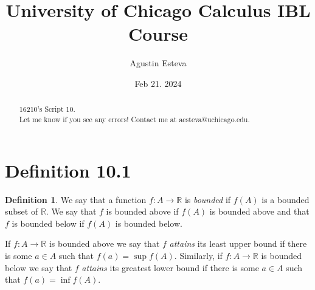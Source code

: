 \documentclass[openany, amssymb, psamsfonts]{amsart}
\title{University of Chicago Calculus IBL Course}
\author{Agustin Esteva}
\date{Feb 21. 2024}
\newcommand{\bbR}{\mathbb{R}}
\theoremstyle{definition}
\newtheorem{defn}{Definition}[section]
\numberwithin{equation}{section}
\begin{document}
\begin{abstract}

16210's Script 10.\\ Let me know if you see any errors! Contact me at aesteva@uchicago.edu.


\end{abstract}

\maketitle

\tableofcontents

\setcounter{section}{10}
\section*{Definition 10.1}
\begin{defn}
\label{10.1}
	We say that a function $f\colon A \to \bbR$ is \emph{bounded} if $f(A)$ is a bounded subset of $\bbR$. We say that $f$ is bounded above if $f(A)$ is bounded above and that $f$ is bounded below if $f(A)$ is bounded below. 
	
	If  $f\colon A \to \bbR$ is bounded above we say that $f$ {\em attains} its least upper bound if there is some $a\in A$ such that $f(a)=\sup f(A).$ Similarly, if $f\colon A \to \bbR$ is bounded below we say that $f$ {\em attains} its greatest lower bound if there is some $a\in A$ such that $f(a)=\inf f(A).$ 
	
\end{defn}
\end{document}
